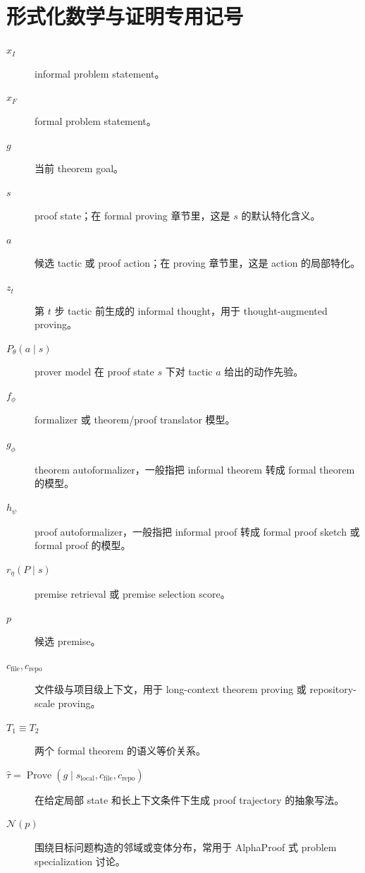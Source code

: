 \section{形式化数学与证明专用记号}

\begin{description}
\item[$x_I$] informal problem statement。

\item[$x_F$] formal problem statement。

\item[$g$] 当前 theorem goal。

\item[$s$] proof state；在 formal proving 章节里，这是 $s$ 的默认特化含义。

\item[$a$] 候选 tactic 或 proof action；在 proving 章节里，这是 action 的局部特化。

\item[$z_t$] 第 $t$ 步 tactic 前生成的 informal thought，用于 thought-augmented proving。

\item[$P_\theta(a \mid s)$] prover model 在 proof state $s$ 下对 tactic $a$ 给出的动作先验。

\item[$f_\phi$] formalizer 或 theorem/proof translator 模型。

\item[$g_\phi$] theorem autoformalizer，一般指把 informal theorem 转成 formal theorem 的模型。

\item[$h_\psi$] proof autoformalizer，一般指把 informal proof 转成 formal proof sketch 或 formal proof 的模型。

\item[$r_\eta(P \mid s)$] premise retrieval 或 premise selection score。

\item[$p$] 候选 premise。

\item[$c_{\mathrm{file}}, c_{\mathrm{repo}}$] 文件级与项目级上下文，用于 long-context theorem proving 或 repository-scale proving。

\item[$T_1 \equiv T_2$] 两个 formal theorem 的语义等价关系。

\item[$\hat{\tau} = \operatorname{Prove}(g \mid s_{\mathrm{local}}, c_{\mathrm{file}}, c_{\mathrm{repo}})$] 在给定局部 state 和长上下文条件下生成 proof trajectory 的抽象写法。

\item[$\mathcal{N}(p)$] 围绕目标问题构造的邻域或变体分布，常用于 AlphaProof 式 problem specialization 讨论。
\end{description}

